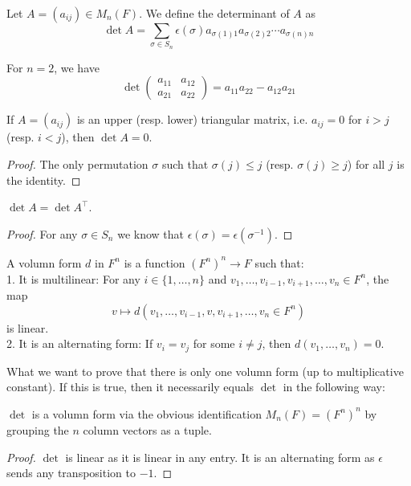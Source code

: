 \begin{definition}
    Let $A=(a_{ij})\in M_n(F)$.
    We define the determinant of $A$ as
    $$\det A=\sum_{\sigma\in S_n}\epsilon(\sigma)a_{\sigma(1)1}a_{\sigma(2)2}\cdots a_{\sigma(n)n}$$
\end{definition}
\begin{example}
    For $n=2$, we have
    $$\det\begin{pmatrix}
        a_{11}&a_{12}\\
        a_{21}&a_{22}
    \end{pmatrix}=a_{11}a_{22}-a_{12}a_{21}$$
\end{example}
\begin{lemma}
    If $A=(a_{ij})$ is an upper (resp. lower) triangular matrix, i.e. $a_{ij}=0$ for $i>j$ (resp. $i<j$), then $\det A=0$.
\end{lemma}
\begin{proof}
    The only permutation $\sigma$ such that $\sigma(j)\le j$ (resp. $\sigma(j)\ge j$) for all $j$ is the identity.
\end{proof}
\begin{lemma}
    $\det A=\det A^\top$.
\end{lemma}
\begin{proof}
    For any $\sigma\in S_n$ we know that $\epsilon(\sigma)=\epsilon(\sigma^{-1})$.
\end{proof}
\begin{definition}
    A volumn form $d$ in $F^n$ is a function $(F^n)^n\to F$ such that:\\
    1. It is multilinear:
    For any $i\in\{1,\ldots,n\}$ and $v_1,\ldots,v_{i-1},v_{i+1},\ldots,v_n\in F^n$, the map
    $$v\mapsto d(v_1,\ldots,v_{i-1},v,v_{i+1},\ldots,v_n\in F^n)$$
    is linear.\\
    2. It is an alternating form:
    If $v_i=v_j$ for some $i\neq j$, then $d(v_1,\ldots,v_n)=0$.
\end{definition}
What we want to prove that there is only one volumn form (up to multiplicative constant).
If this is true, then it necessarily equals $\det$ in the following way:
\begin{lemma}
    $\det$ is a volumn form via the obvious identification $M_n(F)=(F^n)^n$ by grouping the $n$ column vectors as a tuple.
\end{lemma}
\begin{proof}
    $\det$ is linear as it is linear in any entry.
    It is an alternating form as $\epsilon$ sends any transposition to $-1$.
\end{proof}
